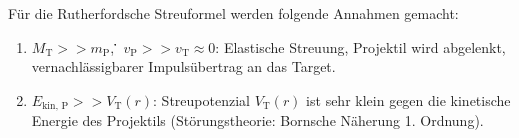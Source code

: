 Für die Rutherfordsche Streuformel werden folgende Annahmen gemacht:
\begin{enumerate}
	\item $M_{\text{T}} >> m_{\text{P}}$, \. \. $v_{\text{P}} >> v_{\text{T}} \approx 0$: Elastische Streuung, Projektil wird abgelenkt, vernachlässigbarer Impulsübertrag an das Target.
	\item $E_{\text{kin, P}} >> V_{\text{T}}(r)$: Streupotenzial $V_{\text{T}}(r)$ ist sehr klein gegen die kinetische Energie des Projektils (Störungstheorie: Bornsche Näherung 1. Ordnung).
\end{enumerate}

%
%
